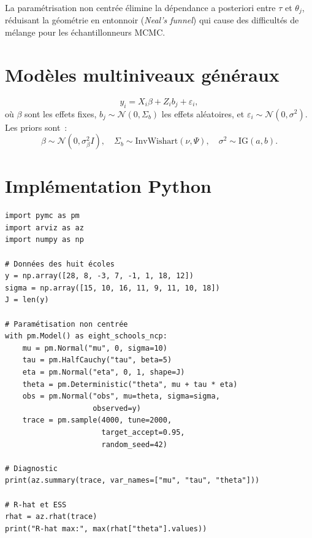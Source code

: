 \begin{remarque}
La param\'etrisation non centr\'ee \'elimine la d\'ependance a posteriori
entre $\tau$ et $\theta_j$, r\'eduisant la g\'eom\'etrie en
\og entonnoir \fg (\textit{Neal's funnel}) qui cause des difficult\'es
de m\'elange pour les \'echantillonneurs MCMC.
\end{remarque}

\section{Mod\`eles multiniveaux g\'en\'eraux}

\begin{definition}
\[
  y_i = X_i \beta + Z_i b_j + \varepsilon_i,
\]
o\`u $\beta$ sont les effets fixes, $b_j \sim \mathcal{N}(0, \Sigma_b)$
les effets al\'eatoires, et $\varepsilon_i \sim \mathcal{N}(0, \sigma^2)$.
Les priors sont~:
\[
  \beta \sim \mathcal{N}(0, \sigma_\beta^2 I), \quad
  \Sigma_b \sim \text{InvWishart}(\nu, \Psi), \quad
  \sigma^2 \sim \text{IG}(a, b).
\]
\end{definition}

\section{Impl\'ementation Python}

\begin{codeblock}[title=\textbf{Mod\`ele des huit \'ecoles avec PyMC}]
\begin{verbatim}
import pymc as pm
import arviz as az
import numpy as np

# Données des huit écoles
y = np.array([28, 8, -3, 7, -1, 1, 18, 12])
sigma = np.array([15, 10, 16, 11, 9, 11, 10, 18])
J = len(y)

# Paramétisation non centrée
with pm.Model() as eight_schools_ncp:
    mu = pm.Normal("mu", 0, sigma=10)
    tau = pm.HalfCauchy("tau", beta=5)
    eta = pm.Normal("eta", 0, 1, shape=J)
    theta = pm.Deterministic("theta", mu + tau * eta)
    obs = pm.Normal("obs", mu=theta, sigma=sigma,
                    observed=y)
    trace = pm.sample(4000, tune=2000,
                      target_accept=0.95,
                      random_seed=42)

# Diagnostic
print(az.summary(trace, var_names=["mu", "tau", "theta"]))

# R-hat et ESS
rhat = az.rhat(trace)
print("R-hat max:", max(rhat["theta"].values))
\end{verbatim}
\end{codeblock}

